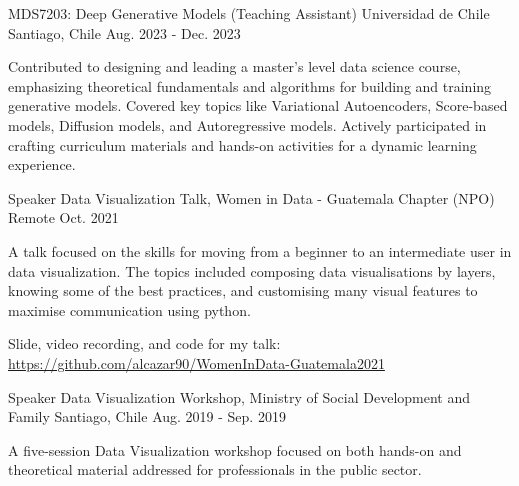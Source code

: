 

\begin{cventries}

  \cventry
    {MDS7203: Deep Generative Models (Teaching Assistant)} %
    {Universidad de Chile}
    {Santiago, Chile}
    {Aug. 2023 - Dec. 2023}
    {
      \begin{cvitems}
        \item {Contributed to designing and leading a master's level data science course, emphasizing theoretical fundamentals and algorithms for building and training generative models. Covered key topics like Variational Autoencoders, Score-based models, Diffusion models, and Autoregressive models. Actively participated in crafting curriculum materials and hands-on activities for a dynamic learning experience.}
      \end{cvitems}
    }
  \cventry
    {Speaker} %
    {Data Visualization Talk, Women in Data - Guatemala Chapter (NPO)} %
    {Remote} %
    {Oct. 2021} %
    {
      \begin{cvitems} %
        \item {A talk focused on the skills for moving from a beginner to an intermediate user in data visualization. The topics included composing data visualisations by layers, knowing some of the best practices, and customising many visual features to maximise communication using python.}
        \item {Slide, video recording, and code for my talk: \url{https://github.com/alcazar90/WomenInData-Guatemala2021}}
      \end{cvitems}
    }
    
  \cventry
    {Speaker} %
    {Data Visualization Workshop, Ministry of Social Development and Family} %
    {Santiago, Chile} %
    {Aug. 2019 - Sep. 2019} %
    {
      \begin{cvitems} %
        \item {A five-session Data Visualization workshop focused on both hands-on and theoretical material addressed for professionals in the public sector.
}
      \end{cvitems}
    }
   

\end{cventries}
